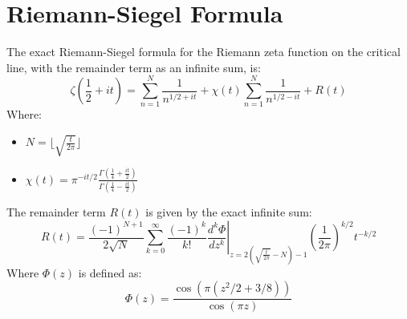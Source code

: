 \documentclass{article}
\begin{document}
\section*{Riemann-Siegel Formula}
The exact Riemann-Siegel formula for the Riemann zeta function on the critical line, with the remainder term as an infinite sum, is:
\begin{equation}
\zeta(\frac{1}{2} + it) = \sum_{n=1}^N \frac{1}{n^{1/2 + it}} + \chi(t) \sum_{n=1}^N \frac{1}{n^{1/2 - it}} + R(t)
\end{equation}
Where:
\begin{itemize}
\item $N = \lfloor\sqrt{\frac{t}{2\pi}}\rfloor$
\item $\chi(t) = \pi^{-it/2} \frac{\Gamma(\frac{1}{4} + \frac{it}{2})}{\Gamma(\frac{1}{4} - \frac{it}{2})}$
\end{itemize}
The remainder term $R(t)$ is given by the exact infinite sum:
\begin{equation}
R(t) = \frac{(-1)^{N+1}}{2\sqrt{N}} \sum_{k=0}^{\infty} \frac{(-1)^k}{k!} \left.\frac{d^k\Phi}{dz^k}\right|_{z=2(\sqrt{\frac{t}{2\pi}} - N) - 1} \left(\frac{1}{2\pi}\right)^{k/2} t^{-k/2}
\end{equation}
Where $\Phi(z)$ is defined as:
\begin{equation}
\Phi(z) = \frac{\cos(\pi(z^2/2 + 3/8))}{\cos(\pi z)}
\end{equation}
\end{document}
